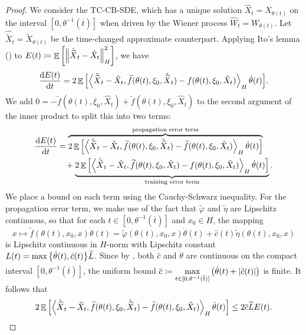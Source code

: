 \begin{proof}
  We consider the TC-CB-SDE, which has a unique solution \(\hat{X}_{t} = X_{\theta(t)}\) on the interval \([0, \theta^{-1}(\overline{t})]\) when driven by the Wiener process \(\hat{W}_{t} = W_{\theta(t)}\). Let \(\hat{\widetilde{X}}_{t} = \widetilde{X}_{\theta(t)}\) be the time-changed approximate counterpart. Applying Ito's lemma (\citealp[Theorem 4.2]{da2014stochastic}) to \(E(t) \coloneqq \mathop{\mathbb{E}}\qty[\norm{ \hat{\widetilde{X}}_{t} - \hat{X}_{t}}^{2}_{H}]\), we have
  \[
    \dv{E(t)}{t} = 2 \mathop{\mathbb{E}}\qty[\ev{ \hat{\widetilde{X}}_{t} - \hat{X}_{t}, \widetilde{f}(\theta(t), \xi_{0}, \hat{\widetilde{X}}_{t}) - f(\theta(t), \xi_{0}, \hat{X}_{t}) }_{H} \dot{\theta}(t)].
  \]
  We add \(0 = -\widetilde{f}(\theta(t), \xi_{0}, \hat{X}_{t}) + \widetilde{f}(\theta(t), \xi_{0}, \hat{X}_{t})\) to the second argument of the inner product to split this into two terms:
  \begin{align}
    \dv{E(t)}{t} &= \overbrace{2 \mathop{\mathbb{E}}\qty[\ev{ \hat{\widetilde{X}}_{t} - \hat{X}_{t}, \widetilde{f}(\theta(t), \xi_{0}, \hat{\widetilde{X}}_{t}) -\widetilde{f}(\theta(t), \xi_{0}, \hat{X}_{t})}_{H} \dot{\theta}(t)]}^{\text{propagation error term}} \notag \\
    &\phantom{=}\, + \underbrace{2 \mathop{\mathbb{E}}\qty[ \ev{ \hat{\widetilde{X}}_{t} - \hat{X}_{t}, \widetilde{f}(\theta(t), \xi_{0}, \hat{X}_{t})  - f(\theta(t), \xi_{0}, \hat{X}_{t})}_{H} \dot{\theta}(t)]}_{\text{training error term}}. \label{eqn:b}
  \end{align}
  We place a bound on each term using the Cauchy-Schwarz inequality. For the propagation error term, we make use of the fact that \(\widetilde{\varphi}\) and \(\widetilde{\eta}\) are Lipschitz continuous, so that for each \(t \in [0, \theta^{-1}(\overline{t})]\) and \(x_{0} \in H\), the mapping
  \[
    x \mapsto \widetilde{f}(\theta(t), x_{0}, x) \dot{\theta}(t) = \widetilde{\varphi}(\theta(t), x_{0}, x)\dot{\theta}(t) + \hat{c}(t) \widetilde{\eta}(\theta(t), x_{0}, x)
  \]
  is Lipschitz continuous in \(H\)-norm with Lipschitz constant \(L(t) = \mathop{\underset{}{\max}}\qty{\dot{\theta}(t), \hat{c}(t)} \widetilde{L}\). Since by , both \(\hat{c}\) and \(\dot{\theta}\) are continuous on the compact interval \([0, \theta^{-1}(\overline{t})]\), the uniform bound \(\overline{c} \coloneqq \mathop{\underset{t \in [0, \theta^{-1}(\overline{t})]}{\max}}\qty(\dot{\theta}(t) + \abs{ \hat{c}(t)})\) is finite. It follows that
  \begin{equation}
    2 \mathop{\mathbb{E}}\qty[ \ev{ \hat{\widetilde{X}}_{t} - \hat{X}_{t}, \widetilde{f}(\theta(t), \xi_{0}, \hat{\widetilde{X}}_{t}) -\widetilde{f}(\theta(t), \xi_{0}, \hat{X}_{t})}_{H} \dot{\theta}(t) ]\leq 2 \overline{c} \widetilde{L} E(t). \label{eqn:petb}

\end{equation}
\end{proof}

